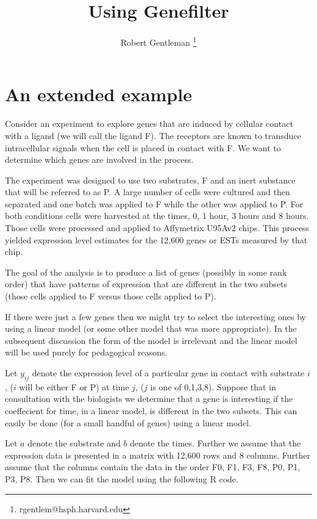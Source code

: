 \documentclass{article}
\begin{document}
\title{Using Genefilter}
\author{Robert Gentleman \thanks{rgentlem@hsph.harvard.edu}
}
\date{}
\maketitle

\section{An extended example}

Consider an experiment to explore genes that are induced by cellular
contact with a ligand (we will call the ligand F).
The receptors are known to transduce intracellular signals when the
cell is placed in contact with F. We want to determine which genes are
involved in the process.

The experiment was designed to use two substrates, F and an inert
substance that will be referred to as P.
A large number of cells were cultured and then separated and one batch
was applied to F while the other was applied to P.
For both conditions cells were harvested at the times, 0, 1 hour, 3
hours and 8 hours. Those cells were processed and applied to
Affymetrix U95Av2 chips. This process yielded expression level
estimates for the 12,600 genes or ESTs measured by that chip.

The goal of the analysis is to produce a list of genes (possibly in
some rank order) that have patterns of expression that are different in
the two subsets (those cells applied to F versus those cells applied
to P).

If there were just a few genes then we might try to select the
interesting ones by using a linear model (or some other model that was
more appropriate). In the subsequent discussion the form of the model
is irrelevant and the linear model will be used purely for pedagogical
reasons.

Let $y_{ij}$ denote the expression level of a particular gene in
contact with substrate $i$, ($i$ will be either F or P) at time $j$,
($j$ is one of 0,1,3,8).
Suppose that in consultation with the biologists we determine that a
gene is interesting if the coeffecient for time, in a linear model, is
different in the two subsets.
This can easily be done (for a small handful of genes) using a linear
model. 

Let $a$ denote the substrate and $b$ denote the times. Further we
assume that the expression data is presented in a matrix with 12,600
rows and 8 columns. Further assume that the columns contain the data
in the order F0, F1, F3, F8, P0, P1, P3, P8.
Then we can fit the model using the following R code.
\end{document}
